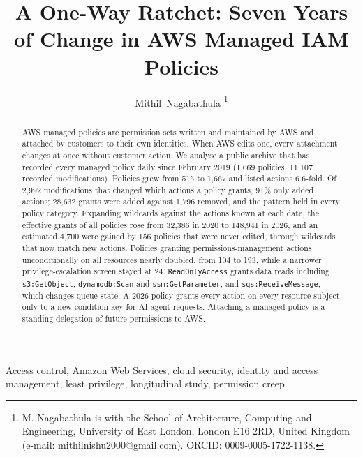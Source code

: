 \documentclass[journal]{IEEEtran}
\begin{document}
\title{A One-Way Ratchet: Seven Years of Change in AWS Managed IAM Policies}

\author{Mithil~Nagabathula%
\thanks{M. Nagabathula is with the School of Architecture, Computing and Engineering, University of East London, London E16 2RD,
United Kingdom (e-mail: mithilnishu2000@gmail.com). ORCID: 0009-0005-1722-1138.}}


\maketitle

\begin{abstract}
AWS managed policies are permission sets written and maintained by AWS and attached by customers to their own identities. When AWS
edits one, every attachment changes at once without customer action. We analyse a public archive that has recorded every managed
policy daily since February 2019 (1{,}669 policies, 11{,}107 recorded modifications). Policies grew from 515 to 1{,}667 and listed
actions 6.6-fold. Of 2{,}992 modifications that changed which actions a policy grants, 91\% only added actions; 28{,}632 grants were
added against 1{,}796 removed, and the pattern held in every policy category. Expanding wildcards against the actions known at each
date, the effective grants of all policies rose from 32{,}386 in 2020 to 148{,}941 in 2026, and an estimated 4{,}700 were gained by
156 policies that were never edited, through wildcards that now match new actions. Policies granting permissions-management actions
unconditionally on all resources nearly doubled, from 104 to 193, while a narrower privilege-escalation screen stayed at 24.
\texttt{ReadOnlyAccess} grants data reads including \texttt{s3:GetObject}, \texttt{dynamodb:Scan} and \texttt{ssm:GetParameter}, and
\texttt{sqs:ReceiveMessage}, which changes queue state. A 2026 policy grants every action on every resource subject only to a new
condition key for AI-agent requests. Attaching a managed policy is a standing delegation of future permissions to AWS.
\end{abstract}

\begin{IEEEkeywords}
Access control, Amazon Web Services, cloud security, identity and access management, least privilege, longitudinal study,
permission creep.
\end{IEEEkeywords}
\end{document}

